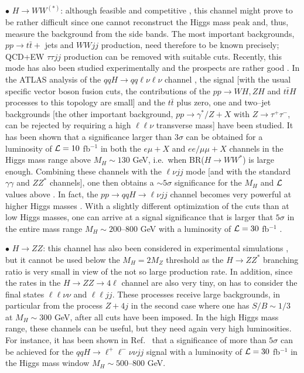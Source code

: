 $\bullet$ \underline{$H \to WW^{(*)}$}: although feasible and competitive
\cite{Zepp-WW}, this channel might prove to be rather difficult since one
cannot reconstruct the Higgs mass peak and, thus, measure the background from
the side bands. The most important backgrounds, $pp \to t\bar t+$ jets and
$WWjj$ production, need therefore to be known precisely; QCD+EW $\tau\tau jj$
production \cite{pp-bkg-Vjj} can be removed with suitable cuts.  Recently, this
mode has also been studied experimentally and the prospects are rather good
\cite{ATLAS-review,Exp:Hqq-WW,High-mass-range}. In the ATLAS analysis of the
$qqH \to qq \ell \nu \ell \nu$ channel \cite{ATLAS-review}, the signal [with
the usual specific vector boson fusion cuts, the contributions of the $pp \to
WH,ZH$ and $t\bar tH$ processes to this topology are small] and the $t\bar t$
plus zero, one and two--jet backgrounds [the other important background,
$pp \to \gamma^*/Z+ X$ with $Z \to \tau^+ \tau^-$, can be rejected by requiring
a high $\ell \ell \nu$ transverse mass] have been studied. It has been shown
that a significance larger than $3\sigma$ can be obtained for a luminosity of 
${\cal L}= 10$ fb$^{-1}$ in both the $e\mu +X$ and $ee/\mu \mu+X$ channels in
the Higgs mass range above $M_H\sim 130$ GeV, i.e.\ when BR($H\to WW^*$) is
large enough.  Combining these channels with the $\ell\nu jj$ mode [and with
the standard $\gamma \gamma$ and $ZZ^*$ channels], one then obtains a $\sim
5\sigma$ significance for the $M_H$ and ${\cal L}$ values  above
\cite{Karl-new}.  In fact, the $pp \to qqH \to \ell \nu jj$ channel becomes
very powerful at higher Higgs masses
\cite{ATLAS-review,CMS-review,High-mass-range,Exp:Hqq-WW-qqlnHeavy}. With a
slightly different optimization of the cuts than at low Higgs masses, one can
arrive at a signal significance that is larger that $5\sigma$ in the entire
mass range $M_H \sim 200$--800 GeV with a luminosity of ${\cal L}= 30$
fb$^{-1}$ \cite{Exp:Hqq-WW-qqlnHeavy}. \s

$\bullet$ \underline{$H \to ZZ$}: this channel has also been considered in
experimental simulations \cite{Exp:Hqq-WW-qqlnHeavy,Exp:Hqq-ZZ}, but it cannot
be used below the $M_H =2M_Z$ threshold as the $H\to ZZ^*$ branching ratio is
very small in view of the not so large production rate. In addition, since the
rates in the $H \to ZZ \to 4\ell$ channel are also very tiny, on has to
consider the final states $\ell \ell \nu \nu$ and $\ell \ell jj$. These
processes receive large backgrounds, in particular from the process $Z+4j$ in
the second case where one has $S/B \sim 1/3$ at $M_H \sim 300$ GeV, after all
cuts have been imposed. In the high Higgs mass range, these channels can be
useful, but they need again very high luminosities. For instance, it has been 
shown in Ref.~\cite{Exp:Hqq-WW-qqlnHeavy} that a significance of more
than $5\sigma$ can be achieved for the $qqH \to \ell^+ \ell^- \nu \nu jj$
signal with a luminosity of ${\cal L}= 30$ fb$^{-1}$ in the Higgs mass window
$M_H \sim 500$--800 GeV.\s

